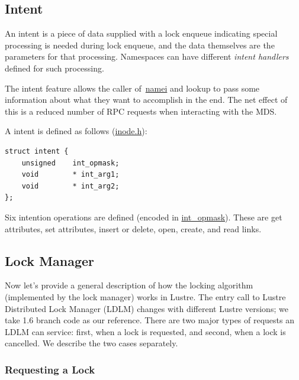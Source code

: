 \subsection{Intent}

An intent is a piece of data supplied with a lock enqueue indicating special
processing is needed during lock enqueue, and the data themselves are the parameters
for that processing. Namespaces can have different \textit{intent handlers}
defined for such processing.

The intent feature allows the caller of~\url{namei} and lookup to pass some information
about what they want to accomplish in the end. The net effect of this is a
reduced number of RPC requests when interacting with the MDS.

A intent is defined as follows (\url{inode.h}):

\begin{Verbatim}
struct intent {
    unsigned    int_opmask;
    void        * int_arg1;
    void        * int_arg2;
};
\end{Verbatim}

Six intention operations are defined (encoded in \url{int_opmask}). These
are get attributes, set attributes, insert or delete, open, create, and
read links.

\subsection{Lock Manager}

Now let's provide a general description of how the locking algorithm
(implemented by the lock manager) works in Lustre.  The entry call to Lustre
Distributed Lock Manager (LDLM) changes with different Lustre versions; we take
1.6 branch code as our reference. There are two major types of requests an
LDLM can service: first, when a lock is requested, and second, when a lock is
cancelled. We describe the two cases separately.

\subsubsection{Requesting a Lock}
\label{sec:requestlock}

